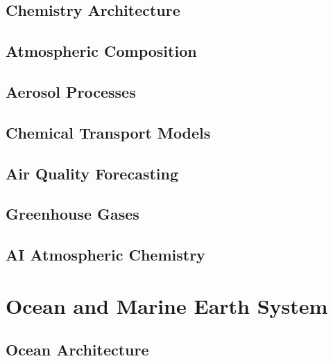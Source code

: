 \documentclass[11pt,a4paper,oneside]{report}
\begin{document}
\chapter{Chemistry Architecture}



\chapter{Atmospheric Composition}



\chapter{Aerosol Processes}



\chapter{Chemical Transport Models}



\chapter{Air Quality Forecasting}



\chapter{Greenhouse Gases}



\chapter{AI Atmospheric Chemistry}



\part{Ocean and Marine Earth System}


\chapter{Ocean Architecture}

\end{document}
